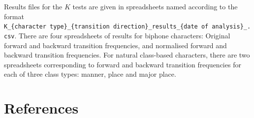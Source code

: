 Results files for the \(K\) tests are given in spreadsheets named
according to the format
\texttt{K\_\{character\ type\}\_\{transition\ direction\}\_results\_\{date\ of\ analysis\}\_.csv}.
There are four spreadsheets of results for biphone characters: Original
forward and backward transition frequencies, and normalised forward and
backward transition frequencies. For natural class-based characters,
there are two spreadsheets corresponding to forward and backward
transition frequencies for each of three class types: manner, place and
major place.

\section*{References}

\printbibliography[keyword=inA2,heading=none]

